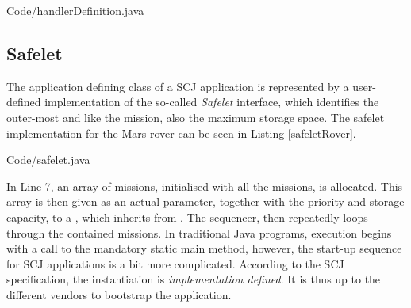 
{Code/handlerDefinition.java}

\subsection{Safelet}
\label{subsection:safelet}
The application defining class of a SCJ application is represented by a user-defined implementation of the so-called \textit{Safelet} interface, which identifies the outer-most  and like the mission, also the maximum storage space. The safelet implementation for the Mars rover can be seen in Listing \ref{safeletRover}.


{Code/safelet.java}

In Line 7, an array of missions, initialised with all the missions, is allocated. This array is then given as an actual parameter, together with the priority and storage capacity, to a , which inherits from . The sequencer, then repeatedly loops through the contained missions. In traditional Java programs, execution begins with a call to the mandatory static main method, however, the start-up sequence for SCJ applications is a bit more complicated. According to the SCJ specification, the  instantiation is \textit{implementation defined}. It is thus up to the different vendors to bootstrap the application.